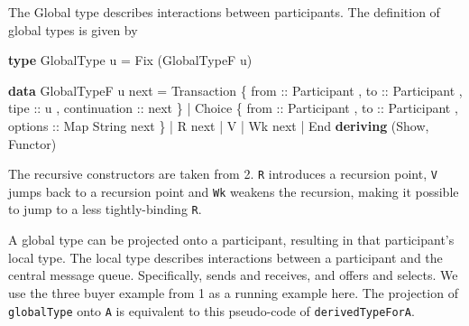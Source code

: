 \documentclass[runningheads]{llncs}
\newenvironment{Shaded}{}{}
\newcommand{\KeywordTok}[1]{\textcolor[rgb]{0.00,0.44,0.13}{\textbf{#1}}}
\newcommand{\DataTypeTok}[1]{\textcolor[rgb]{0.56,0.13,0.00}{#1}}
\newcommand{\OtherTok}[1]{\textcolor[rgb]{0.00,0.44,0.13}{#1}}
\newcommand{\FunctionTok}[1]{\textcolor[rgb]{0.02,0.16,0.49}{#1}}
\newcommand{\NormalTok}[1]{#1}
\begin{document}
The Global type describes interactions between participants. The
definition of global types is given by

\begin{Shaded}
\begin{Highlighting}[]
\KeywordTok{type} \DataTypeTok{GlobalType}\NormalTok{ u }\FunctionTok{=} \DataTypeTok{Fix}\NormalTok{ (}\DataTypeTok{GlobalTypeF}\NormalTok{ u)}

\KeywordTok{data} \DataTypeTok{GlobalTypeF}\NormalTok{ u next}
    \FunctionTok{=} \DataTypeTok{Transaction} 
\NormalTok{        \{}\OtherTok{ from ::} \DataTypeTok{Participant}
\NormalTok{        ,}\OtherTok{ to ::} \DataTypeTok{Participant}
\NormalTok{        ,}\OtherTok{ tipe ::}\NormalTok{ u}
\NormalTok{        ,}\OtherTok{ continuation ::}\NormalTok{  next }
\NormalTok{        \} }
    \FunctionTok{|} \DataTypeTok{Choice} 
\NormalTok{        \{}\OtherTok{ from ::} \DataTypeTok{Participant}
\NormalTok{        ,}\OtherTok{ to ::} \DataTypeTok{Participant}
\NormalTok{        ,}\OtherTok{ options ::} \DataTypeTok{Map} \DataTypeTok{String}\NormalTok{ next }
\NormalTok{        \}}
    \FunctionTok{|} \DataTypeTok{R}\NormalTok{ next}
    \FunctionTok{|} \DataTypeTok{V}
    \FunctionTok{|} \DataTypeTok{Wk}\NormalTok{ next}
    \FunctionTok{|} \DataTypeTok{End}
    \KeywordTok{deriving}\NormalTok{ (}\DataTypeTok{Show}\NormalTok{, }\DataTypeTok{Functor}\NormalTok{)}
\end{Highlighting}
\end{Shaded}

The recursive constructors are taken from 2. \texttt{R} introduces a
recursion point, \texttt{V} jumps back to a recursion point and
\texttt{Wk} weakens the recursion, making it possible to jump to a less
tightly-binding \texttt{R}.

A global type can be projected onto a participant, resulting in that
participant's local type. The local type describes interactions between
a participant and the central message queue. Specifically, sends and
receives, and offers and selects. We use the three buyer example from 1
as a running example here. The projection of \texttt{globalType} onto
\texttt{A} is equivalent to this pseudo-code of
\texttt{derivedTypeForA}.
\end{document}
